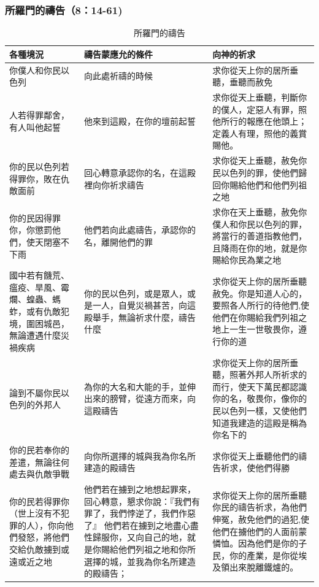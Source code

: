 \documentclass{ctexart}
\begin{document}
\subsubsection{所羅門的禱告（8：14-61)}
\begin{table}[!hbp]
\centering 
\begin{tabular}{|p{4cm}|p{5cm}|p{6.5cm}|}
\hline
\hline
各種境況 & 禱告蒙應允的條件 & 向神的祈求\\\hline\hline
你僕人和你民以色列 &  向此處祈禱的時候  & 求你從天上你的居所垂聽，垂聽而赦免   \\\hline
人若得罪鄰舍，有人叫他起誓&    他來到這殿，在你的壇前起誓&求你從天上垂聽，判斷你的僕人，定惡人有罪，照他所行的報應在他頭上；定義人有理，照他的義賞賜他。 \\\hline
你的民以色列若得罪你，敗在仇敵面前&回心轉意承認你的名，在這殿裡向你祈求禱告&求你從天上垂聽，赦免你民以色列的罪，使他們歸回你賜給他們和他們列祖之地  \\\hline
你的民因得罪你，你懲罰他們，使天閉塞不下雨&他們若向此處禱告，承認你的名，離開他們的罪&求你在天上垂聽，赦免你僕人和你民以色列的罪，將當行的善道指教他們，且降雨在你的地，就是你賜給你民為業之地\\\hline
國中若有饑荒、瘟疫、旱風、霉爛、蝗蟲、螞蚱，或有仇敵犯境，圍困城邑，無論遭遇什麼災禍疾病&你的民以色列，或是眾人，或是一人，自覺災禍甚苦，向這殿舉手，無論祈求什麼，禱告什麼&求你從天上你的居所垂聽赦免。你是知道人心的，要照各人所行的待他們,使他們在你賜給我們列祖之地上一生一世敬畏你，遵行你的道\\\hline
論到不屬你民以色列的外邦人&為你的大名和大能的手，並伸出來的膀臂，從遠方而來，向這殿禱告  &求你從天上你的居所垂聽，照著外邦人所祈求的而行，使天下萬民都認識你的名，敬畏你，像你的民以色列一樣，又使他們知道我建造的這殿是稱為你名下的\\\hline
你的民若奉你的差遣，無論往何處去與仇敵爭戰& 向你所選擇的城與我為你名所建造的殿禱告 &求你從天上垂聽他們的禱告祈求，使他們得勝\\\hline
你的民若得罪你（世上沒有不犯罪的人），你向他們發怒，將他們交給仇敵擄到或遠或近之地 & 他們若在擄到之地想起罪來，回心轉意，懇求你說：『我們有罪了，我們悖逆了，我們作惡了』 他們若在擄到之地盡心盡性歸服你，又向自己的地，就是你賜給他們列祖之地和你所選擇的城，並我為你名所建造的殿禱告； &求你從天上你的居所垂聽你民的禱告祈求，為他們伸冤，赦免他們的過犯,使他們在擄他們的人面前蒙憐恤。因為他們是你的子民，你的產業，是你從埃及領出來脫離鐵爐的。  \\\hline
\end{tabular}
\caption{所羅門的禱告}
\end{table}
\end{document}
